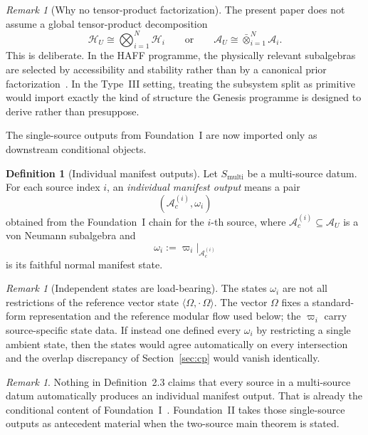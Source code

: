 \documentclass[12pt]{article}
\theoremstyle{definition}
\newtheorem{definition}[theorem]{Definition}
\theoremstyle{remark}
\newtheorem{remark}[theorem]{Remark}
\begin{document}
\begin{remark}[Why no tensor-product factorization]\label{rem:notensor}
The present paper does not assume a global tensor-product decomposition
\[
\mathcal H_U \cong \bigotimes_{i=1}^N \mathcal H_i
\qquad \text{or} \qquad
\mathcal A_U \cong \bar\otimes_{i=1}^N \mathcal A_i.
\]
This is deliberate. In the HAFF programme, the physically relevant
subalgebras are selected by accessibility and stability rather than by a
canonical prior factorization~\cite{HAFFA,HAFFD}. In the Type~III
setting, treating the subsystem split as primitive would import exactly
the kind of structure the Genesis programme is designed to derive rather
than presuppose.
\end{remark}

The single-source outputs from Foundation~I are now imported only as
downstream conditional objects.

\begin{definition}[Individual manifest outputs]
Let \(S_{\mathrm{multi}}\) be a multi-source datum. For each source
index \(i\), an \emph{individual manifest output} means a pair
\[
(\mathcal A_c^{(i)},\omega_i)
\]
obtained from the Foundation~I chain for the \(i\)-th source, where
\(\mathcal A_c^{(i)}\subseteq \mathcal A_U\) is a von Neumann
subalgebra and
\[
\omega_i:=\varpi_i|_{\mathcal A_c^{(i)}}
\]
is its faithful normal manifest state.
\end{definition}

\begin{remark}[Independent states are load-bearing]
The states \(\omega_i\) are not all restrictions of the reference vector
state \(\langle\Omega,\cdot\,\Omega\rangle\). The vector \(\Omega\)
fixes a standard-form representation and the reference modular flow used
below; the \(\varpi_i\) carry source-specific state data. If instead one
defined every \(\omega_i\) by restricting a single ambient state, then
the states would agree automatically on every intersection and the
overlap discrepancy of Section~\ref{sec:cp} would vanish identically.
\end{remark}

\begin{remark}
Nothing in Definition~2.3 claims that every source in a multi-source
datum automatically produces an individual manifest output. That is
already the conditional content of Foundation~I~\cite{FoundationI}.
Foundation~II takes those single-source outputs as antecedent material
when the two-source main theorem is stated.
\end{remark}
\end{document}
